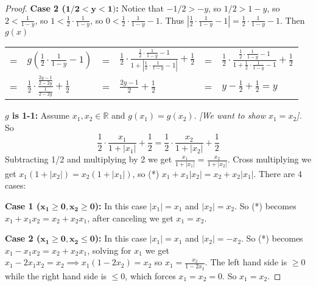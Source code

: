 \documentclass[14pt]{extarticle}
\newcommand{\dps}{\displaystyle}
\newcommand{\R}{\mathbb{R}}
\begin{document}
\begin{proof}
    {\bf Case 2 (\(\bm{1/2 < y < 1})\):} Notice that \(-1/2 > -y\), so \(1/2 > 1-y\), so \(2 < \frac{1}{1-y}\), so \(1 <
    \frac{1}{2} \cdot \frac{1}{1-y}\), so \(0 < \frac{1}{2} \cdot \frac{1}{1-y} - 1\). Thus \(\left|\frac{1}{2} \cdot
    \frac{1}{1-y} - 1 \right| = \frac{1}{2} \cdot \frac{1}{1-y} - 1\). Then $g(x)$
    \begin{center}
        \begin{tabular}{llllll}
            =                   & \(\dps g\left(\frac{1}{2} \cdot \frac{1}{1-y} - 1 \right)\)                       & =                                          & \(\dps \frac{1}{2} \cdot \frac{\frac{1}{2} \cdot \frac{1}{1-y} - 1}{1 + \left|\frac{1}{2} \cdot \frac{1}{1-y} - 1 \right|} + \frac{1}{2}\) & = & \(\dps \frac{1}{2} \cdot \frac{\frac{1}{2} \cdot \frac{1}{1-y} - 1}{1 + \frac{1}{2} \cdot \frac{1}{1-y} - 1} + \frac{1}{2}\) \\
            =                   & \(\dps \frac{1}{2} \cdot \frac{\frac{2y-1}{2-2y}}{\frac{1}{2-2y}} + \frac{1}{2}\) & =                                          & \(\dps \frac{2y-1}
            {2} + \frac{1}{2}\) & =                                                                                 & \(\dps y - \frac{1}{2} + \frac{1}{2} = y\)
        \end{tabular}
    \end{center}

    {\bf $g$ is 1-1:} Assume \(x_1, x_2 \in \R\) and \(g(x_1) = g(x_2)\). {\it [We want to show \(x_1 = x_2\)].} So
    \[
        \frac{1}{2} \cdot \frac{x_1}{1 + |x_1|} + \frac{1}{2} = \frac{1}{2} \cdot \frac{x_2}{1 + |x_2|} + \frac{1}{2}
    \]
    Subtracting 1/2 and multiplying by 2 we get \(\dps \frac{x_1}{1 + |x_1|} = \frac{x_2}{1 + |x_2|}\). Cross
    multiplying we get \(x_1(1+|x_2|) = x_2(1+|x_1|)\), so (*) \(x_1 + x_1|x_2| = x_2 + x_2|x_1|\). There are 4 cases:

    {\bf Case 1 (\(\bm{x_1 \geq 0, x_2 \geq 0}\)):} In this case \(|x_1| = x_1\) and \(|x_2| = x_2\). So (*) becomes
    \(x_1 + x_1x_2 = x_2 + x_2x_1\), after canceling we get \(x_1 = x_2\).

        {\bf Case 2 (\(\bm{x_1 \geq 0, x_2 \leq 0}\)):} In this case \(|x_1| = x_1\) and \(|x_2| = -x_2\). So (*) becomes
    \(x_1 - x_1x_2 = x_2 + x_2x_1\), solving for $x_1$ we get \(x_1 - 2x_1x_2 = x_2 \implies x_1(1-2x_2) = x_2\) so
    \(\dps x_1 = \frac{x_2}{1-2x_2}\). The left hand side is \(\geq 0\) while the right hand side is \(\leq 0\), which
    forces \(x_1 = x_2 = 0\). So \(x_1 = x_2\).


\end{proof}
\end{document}

